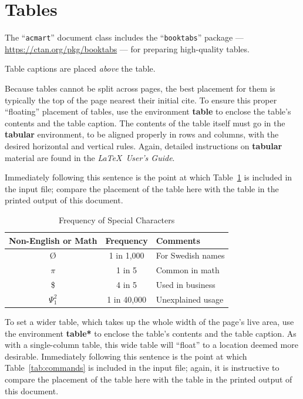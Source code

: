 \documentclass[sigplan,screen,nonacm]{acmart}
\begin{document}
\section{Tables}

The ``\verb|acmart|'' document class includes the ``\verb|booktabs|''
package --- \url{https://ctan.org/pkg/booktabs} --- for preparing
high-quality tables.

Table captions are placed \textit{above} the table.

Because tables cannot be split across pages, the best placement for
them is typically the top of the page nearest their initial cite.  To
ensure this proper ``floating'' placement of tables, use the
environment \textbf{table} to enclose the table's contents and the
table caption.  The contents of the table itself must go in the
\textbf{tabular} environment, to be aligned properly in rows and
columns, with the desired horizontal and vertical rules.  Again,
detailed instructions on \textbf{tabular} material are found in the
\textit{\LaTeX\ User's Guide}.

Immediately following this sentence is the point at which
Table~\ref{tab:freq} is included in the input file; compare the
placement of the table here with the table in the printed output of
this document.

\begin{table}
  \caption{Frequency of Special Characters}
  \label{tab:freq}
  \begin{tabular}{ccl}
    \toprule
    Non-English or Math&Frequency&Comments\\
    \midrule
    \O & 1 in 1,000& For Swedish names\\
    $\pi$ & 1 in 5& Common in math\\
    \$ & 4 in 5 & Used in business\\
    $\Psi^2_1$ & 1 in 40,000& Unexplained usage\\
  \bottomrule
\end{tabular}
\end{table}

To set a wider table, which takes up the whole width of the page's
live area, use the environment \textbf{table*} to enclose the table's
contents and the table caption.  As with a single-column table, this
wide table will ``float'' to a location deemed more
desirable. Immediately following this sentence is the point at which
Table~\ref{tab:commands} is included in the input file; again, it is
instructive to compare the placement of the table here with the table
in the printed output of this document.
\end{document}
